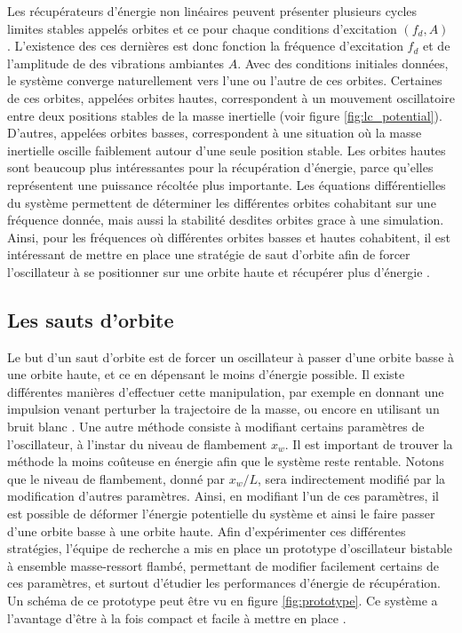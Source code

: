 \documentclass[a4paper, french, 12pt, titlepage]{article}
\begin{document}
\noindent Les récupérateurs d'énergie non linéaires peuvent présenter plusieurs cycles limites stables appelés orbites et ce pour chaque conditions d'excitation $(f_d, A)$ .
L'existence des ces dernières est donc fonction la fréquence d'excitation $f_d$ et de l'amplitude de des vibrations ambiantes $A$.
Avec des conditions initiales données, le système converge naturellement vers l'une ou l'autre de ces orbites.
Certaines de ces orbites, appelées orbites hautes, correspondent à un mouvement oscillatoire entre deux positions stables de la masse inertielle (voir figure \ref{fig:lc_potential}).
D'autres, appelées orbites basses, correspondent à une situation où la masse inertielle oscille faiblement autour d'une seule position stable.
Les orbites hautes sont beaucoup plus intéressantes pour la récupération d'énergie, parce qu'elles représentent une puissance récoltée plus importante.
Les équations différentielles du système permettent de déterminer les différentes orbites cohabitant sur une fréquence donnée, mais aussi la stabilité desdites orbites grace à une simulation.
Ainsi, pour les fréquences où différentes orbites basses et hautes cohabitent, il est intéressant de mettre en place une stratégie de saut d'orbite afin de forcer l'oscillateur à se positionner sur une orbite haute et récupérer plus d'énergie \cite{saint2022power}.






\subsection{Les sauts d'orbite}

Le but d'un saut d'orbite est de forcer un oscillateur à passer d'une orbite basse à une orbite haute, et ce en dépensant le moins d'énergie possible.
Il existe différentes manières d'effectuer cette manipulation, par exemple en donnant une impulsion venant perturber la trajectoire de la masse, ou encore en utilisant un bruit blanc \cite{huguet2018phd}.
Une autre méthode consiste à modifiant certains paramètres de l'oscillateur, à l'instar du niveau de flambement $x_w$.
Il est important de trouver la méthode la moins coûteuse en énergie afin que le système reste rentable.
Notons que le niveau de flambement, donné par $x_w/ L$, sera indirectement modifié par la modification d'autres paramètres.
Ainsi, en modifiant l'un de ces paramètres, il est possible de déformer l'énergie potentielle du système et ainsi le faire passer d'une orbite basse à une orbite haute.
Afin d'expérimenter ces différentes stratégies, l'équipe de recherche a mis en place un prototype d'oscillateur bistable à ensemble masse-ressort flambé, permettant de modifier facilement certains de ces paramètres, et surtout d'étudier les performances d'énergie de récupération.
Un schéma de ce prototype peut être vu en figure \ref{fig:prototype}.
Ce système a l'avantage d'être à la fois compact et facile à mettre en place \cite{Liu2014}.
\end{document}
